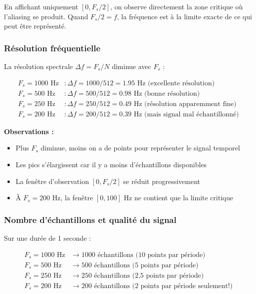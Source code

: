\documentclass[12pt,a4paper]{article}
\begin{document}
En affichant uniquement $[0, F_s/2]$, on observe directement la zone critique où l'aliasing se produit. Quand $F_s/2 = f$, la fréquence est à la limite exacte de ce qui peut être représenté.

\subsubsection{Résolution fréquentielle}

La résolution spectrale $\Delta f = F_s / N$ diminue avec $F_s$ :

\begin{align}
    F_s = 1000 \text{ Hz} &: \Delta f = 1000/512 = 1.95 \text{ Hz (excellente résolution)} \\
    F_s = 500 \text{ Hz} &: \Delta f = 500/512 = 0.98 \text{ Hz (bonne résolution)} \\
    F_s = 250 \text{ Hz} &: \Delta f = 250/512 = 0.49 \text{ Hz (résolution apparemment fine)} \\
    F_s = 200 \text{ Hz} &: \Delta f = 200/512 = 0.39 \text{ Hz (mais signal mal échantillonné)}
\end{align}

\textbf{Observations :}
\begin{itemize}
    \item Plus $F_s$ diminue, moins on a de points pour représenter le signal temporel
    \item Les pics s'élargissent car il y a moins d'échantillons disponibles
    \item La fenêtre d'observation $[0, F_s/2]$ se réduit progressivement
    \item À $F_s = 200$ Hz, la fenêtre $[0, 100]$ Hz ne contient que la limite critique
\end{itemize}

\subsubsection{Nombre d'échantillons et qualité du signal}

Sur une durée de 1 seconde :

\begin{align}
    F_s = 1000 \text{ Hz} &\rightarrow 1000 \text{ échantillons (10 points par période)} \\
    F_s = 500 \text{ Hz} &\rightarrow 500 \text{ échantillons (5 points par période)} \\
    F_s = 250 \text{ Hz} &\rightarrow 250 \text{ échantillons (2,5 points par période)} \\
    F_s = 200 \text{ Hz} &\rightarrow 200 \text{ échantillons (2 points par période seulement!)}
\end{align}
\end{document}
